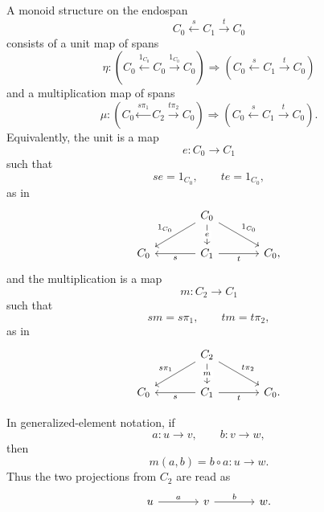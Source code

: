 A monoid structure on the endospan
\[
    C_0 \xleftarrow{s} C_1 \xrightarrow{t} C_0
\]
consists of a unit map of spans
\[
    \eta:
    \left(
        C_0
        \xleftarrow{1_{C_0}}
        C_0
        \xrightarrow{1_{C_0}}
        C_0
    \right)
    \Longrightarrow
    \left(
        C_0
        \xleftarrow{s}
        C_1
        \xrightarrow{t}
        C_0
    \right)
\]
and a multiplication map of spans
\[
    \mu:
    \left(
        C_0
        \xleftarrow{s\pi_1}
        C_2
        \xrightarrow{t\pi_2}
        C_0
    \right)
    \Longrightarrow
    \left(
        C_0
        \xleftarrow{s}
        C_1
        \xrightarrow{t}
        C_0
    \right).
\]
Equivalently, the unit is a map
\[
    e:C_0\to C_1
\]
such that
\[
    se=1_{C_0},
    \qquad
    te=1_{C_0},
\]
as in
\[
    \begin{tikzcd}[column sep=large]
        & 
            C_0 
                \arrow[d, "e" description] 
                \arrow[dl, "1_{C_0}"'] 
                \arrow[dr, "1_{C_0}"] 
        & 
        \\
            C_0
        & 
            C_1 
                \arrow[l, "s"] 
                \arrow[r, "t"'] 
        & 
            C_0,
    \end{tikzcd}
\]
and the multiplication is a map
\[
    m:C_2\to C_1
\]
such that
\[
    sm=s\pi_1,
    \qquad
    tm=t\pi_2,
\]
as in
\[
    \begin{tikzcd}[column sep=large]
        & 
            C_2 
                \arrow[d, "m" description] 
                \arrow[dl, "s\pi_1"'] 
                \arrow[dr, "t\pi_2"] 
        & 
        \\
            C_0 
        & 
            C_1 
                \arrow[l, "s"] 
                \arrow[r, "t"'] 
        & 
            C_0.
    \end{tikzcd}
\]

In generalized-element notation, if
\[
    a:u\to v,
    \qquad
    b:v\to w,
\]
then
\[
    m(a,b)=b\circ a:u\to w.
\]
Thus the two projections from \(C_2\) are read as
\[
    \begin{tikzcd}[column sep=large]
            u
                \arrow[r, "a"]
        &
            v
                \arrow[r, "b"]
        &
            w.
    \end{tikzcd}
\]

